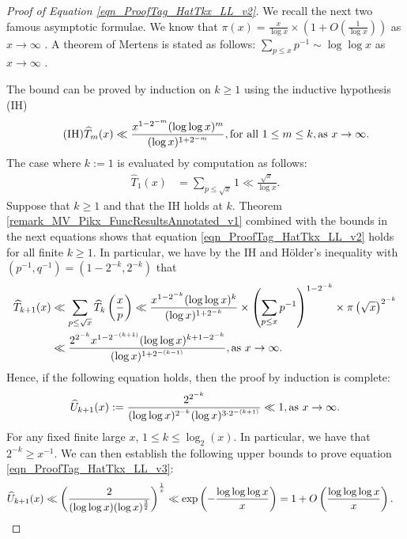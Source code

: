\documentclass[11pt,reqno,a4letter]{article}
\newcommand{\hlocalref}[1]{\hyperref[#1]{\ref{#1}}}
\numberwithin{equation}{section}
\numberwithin{figure}{section}
\numberwithin{table}{section}
\theoremstyle{plain}
\numberwithin{theorem}{section}
\theoremstyle{definition}
\theoremstyle{remark}
\newcommand{\mathtext}[1]{\text{\rm #1}}
\begin{document}
\begin{proof}[Proof of Equation \eqref{eqn_ProofTag_HatTkx_LL_v2}]
We recall the next two famous asymptotic formulae.
We know that 
$\pi(x) = \frac{x}{\log x} \times \left(1 + O\left(\frac{1}{\log x}\right)\right)$ 
as $x \rightarrow \infty$ \cite[\S 22.4]{HARDYWRIGHT}. 
A theorem of Mertens is stated as follows: 
$\sum_{p \leq x} p^{-1} \sim \log\log x$ as $x \rightarrow \infty$ 
\cite[\S 22.7--22.8]{HARDYWRIGHT}. 

The bound can be proved by induction on $k \geq 1$ using the inductive hypothesis (IH)
\[
\tag{IH}
\widehat{T}_m(x) \ll \frac{x^{1-2^{-m}} (\log\log x)^{m}}{(\log x)^{1+2^{-m}}}, 
	\mathtext{ for all } 1 \leq m \leq k, 
	\mathtext{ as } x \rightarrow \infty. 
\] 
The case where $k := 1$ is evaluated by computation as follows: 
\begin{align*}
\widehat{T}_1(x) & = \sum_{p \leq \sqrt{x}} 1 \ll \frac{\sqrt{x}}{\log x}. 
\end{align*}
Suppose that $k \geq 1$ and that the IH holds at $k$. 
Theorem \hlocalref{remark_MV_Pikx_FuncResultsAnnotated_v1} 
combined with the bounds in the next equations shows that 
equation \eqref{eqn_ProofTag_HatTkx_LL_v2} holds for all finite $k \geq 1$.
In particular, we have by the IH and 
H\"older's inequality with $\left(p^{-1}, q^{-1}\right) = \left(1-2^{-k}, 2^{-k}\right)$ that 
\begin{align*}
\widehat{T}_{k+1}(x) & \ll \sum_{p \leq \sqrt{x}} \widehat{T}_{k}\left(\frac{x}{p}\right) 
     \ll \frac{x^{1-2^{-k}} (\log\log x)^{k}}{(\log x)^{1+2^{-k}}} \times 
	\left(\sum_{p \leq x} p^{-1}\right)^{1-2^{-k}} \times 
	\pi\left(\sqrt{x}\right)^{2^{-k}} \\ 
     & \ll \frac{2^{2^{-k}} x^{1-2^{-(k+1)}} (\log\log x)^{k+1-2^{-k}}}{(\log x)^{1+2^{-(k-1)}}} ,
	\mathtext{ as } x \rightarrow \infty. 
\end{align*}
Hence, if the following equation holds, then the proof by induction is complete:
\begin{equation}
\label{eqn_ProofTag_HatTkx_LL_v3}
\widehat{U}_{k+1}(x) := \frac{2^{2^{-k}}}{(\log\log x)^{2^{-k}} (\log x)^{3 \cdot 2^{-(k+1)}}} \ll 1, 
     \mathtext{ as } x \rightarrow \infty. 
\end{equation}
For any fixed finite large $x$, $1 \leq k \leq \log_2(x)$. 
In particular, we have that $2^{-k} \geq x^{-1}$. 
We can then establish the following upper bounds to prove 
equation \eqref{eqn_ProofTag_HatTkx_LL_v3}: 
\begin{align*}
\widehat{U}_{k+1}(x) & \ll \left(\frac{2}{(\log\log x) (\log x)^{\frac{3}{2}}}\right)^{\frac{1}{x}} 
     \ll \exp\left(-\frac{\log\log\log x}{x}\right) = 1 + O\left(\frac{\log\log\log x}{x}\right). 
     \qedhere
\end{align*}
\end{proof}
\end{document}
